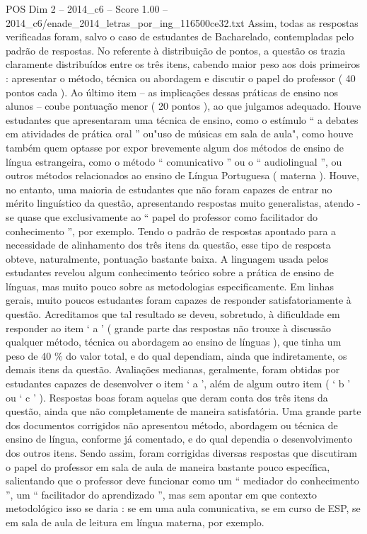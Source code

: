 \begin{textsample}{POS Dim 2 – 2014\_c6 – Score 1.00 – 2014\_c6/enade\_2014\_letras\_por\_ing\_116500ce32.txt}
Assim, todas as respostas verificadas foram, salvo o caso de estudantes de Bacharelado, contempladas pelo padrão de respostas.
No referente à distribuição de pontos, a questão os trazia claramente distribuídos entre os três itens, cabendo maior peso aos dois primeiros : apresentar o método, técnica ou abordagem e discutir o papel do professor ( 40 pontos cada ).
Ao último item – as implicações dessas práticas de ensino nos alunos – coube pontuação menor ( 20 pontos ), ao que julgamos adequado.
Houve estudantes que apresentaram uma técnica de ensino, como o estímulo “ a debates em atividades de prática oral ” ou"uso de músicas em sala de aula", como houve também quem optasse por expor brevemente algum dos métodos de ensino de língua estrangeira, como o método “ comunicativo ” ou o “ audiolingual ”, ou outros métodos relacionados ao ensino de Língua Portuguesa ( materna ).
Houve, no entanto, uma maioria de estudantes que não foram capazes de entrar no mérito linguístico da questão, apresentando respostas muito generalistas, atendo -se quase que exclusivamente ao “ papel do professor como facilitador do conhecimento ”, por exemplo.
Tendo o padrão de respostas apontado para a necessidade de alinhamento dos três itens da questão, esse tipo de resposta obteve, naturalmente, pontuação bastante baixa.
A linguagem usada pelos estudantes revelou algum conhecimento teórico sobre a prática de ensino de línguas, mas muito pouco sobre as metodologias especificamente.
Em linhas gerais, muito poucos estudantes foram capazes de responder satisfatoriamente à questão.
Acreditamos que tal resultado se deveu, sobretudo, à dificuldade em responder ao item ‘ a ’ ( grande parte das respostas não trouxe à discussão qualquer método, técnica ou abordagem ao ensino de línguas ), que tinha um peso de 40 \% do valor total, e do qual dependiam, ainda que indiretamente, os demais itens da questão.
Avaliações medianas, geralmente, foram obtidas por estudantes capazes de desenvolver o item ‘ a ’, além de algum outro item ( ‘ b ’ ou ‘ c ’ ).
Respostas boas foram aquelas que deram conta dos três itens da questão, ainda que não completamente de maneira satisfatória.
Uma grande parte dos documentos corrigidos não apresentou método, abordagem ou técnica de ensino de língua, conforme já comentado, e do qual dependia o desenvolvimento dos outros itens.
Sendo assim, foram corrigidas diversas respostas que discutiram o papel do professor em sala de aula de maneira bastante pouco específica, salientando que o professor deve funcionar como um “ mediador do conhecimento ”, um “ facilitador do aprendizado ”, mas sem apontar em que contexto metodológico isso se daria : se em uma aula comunicativa, se em curso de ESP, se em sala de aula de leitura em língua materna, por exemplo.

\end{textsample}
